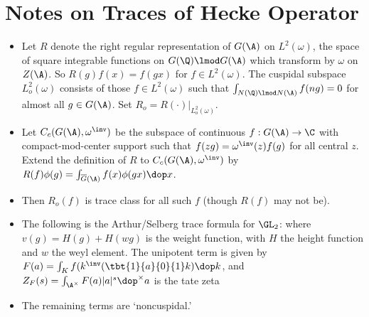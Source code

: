 \documentclass[11pt]{amsart}
\begin{document}
\section{Notes on Traces of Hecke Operator}
\begin{itemize}
  \item Let $R$ denote the right regular representation of $G(\A)$ on $L^2(\omega)$, the space of square integrable functions on $G(\Q)\lmod G(\A)$ which transform by $\omega$ on $Z(\A)$. So $R(g)f(x)=f(gx)$ for $f\in L^2(\omega)$. The cuspidal subspace $L_o^2(\omega)$ consists of those $f\in L^2(\omega)$ such that $\int_{N(\Q) \lmod N(\A)} f(ng)=0$ for almost all $g \in G(\A)$.  Set $R_o = R(\cdot) |_{L_o^2(\omega)}$. 
  \item Let $C_c(G(\A),\omega^\inv)$ be the subspace of continuous $f:G(\A) \to \C$ with compact-mod-center support such that $f(zg)=\omega^\inv(z)f(g)$ for all central $z$. Extend the definition of $R$ to $C_c(G(\A),\omega^\inv)$ by $R(f)\phi(g) = \int_{\overline{G}(\A)} f(x) \phi(gx) \dop x$.
  \item Then $R_o(f)$ is trace class for all such $f$ (though $R(f)$ may not be).
  \item The following is the Arthur/Selberg trace formula for $\GL_2$: 
 		where $v(g)=H(g)+H(wg)$ is the weight function, with $H$ the height function and $w$ the weyl element.  The unipotent term is given by $F(a)=\int_K f(k^\inv (\tbt{1}{a}{0}{1} k ) \dop k$, and $Z_F(s)= \int_{\A^\times } F(a) |a|^s \dop^\times a$ is the tate zeta 
   \item The remaining terms are `noncuspidal.' 

\end{itemize}
\end{document}
